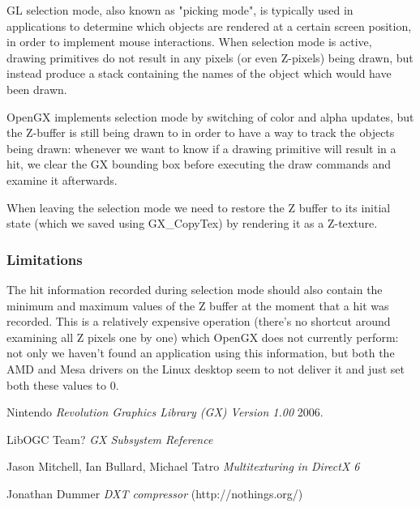 \documentclass[12pt]{article}
\begin{document}
GL selection mode, also known as "picking mode", is typically used in applications to determine which objects are rendered at a certain screen position, in order to implement mouse interactions. When selection mode is active, drawing primitives do not result in any pixels (or even Z-pixels) being drawn, but instead produce a stack containing the names of the object which would have been drawn.

OpenGX implements selection mode by switching of color and alpha updates, but the Z-buffer is still being drawn to in order to have a way to track the objects being drawn: whenever we want to know if a drawing primitive will result in a hit, we clear the GX bounding box before executing the draw commands and examine it afterwards.

When leaving the selection mode we need to restore the Z buffer to its initial state (which we saved using GX\_CopyTex) by rendering it as a Z-texture.

\subsubsection {Limitations}

The hit information recorded during selection mode should also contain the minimum and maximum values of the Z buffer at the moment that a hit was recorded. This is a relatively expensive operation (there's no shortcut around examining all Z pixels one by one) which OpenGX does not currently perform: not only we haven't found an application using this information, but both the AMD and Mesa drivers on the Linux desktop seem to not deliver it and just set both these values to 0.


\pagebreak[4]

\begin{thebibliography}{1}

   Nintendo {\em Revolution Graphics Library (GX) Version 1.00}  2006.

   LibOGC Team? {\em GX Subsystem Reference }

   Jason Mitchell, Ian Bullard, Michael Tatro  {\em Multitexturing in DirectX 6 }
  
   Jonathan Dummer {\em DXT compressor } (http://nothings.org/)
  
\end{thebibliography}
\end{document}
